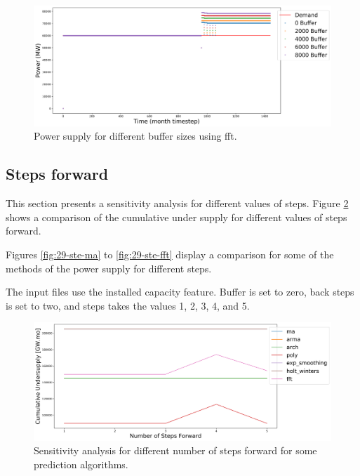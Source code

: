 \documentclass[11pt]{article}
\begin{document}
\begin{figure}[H]
	\centering
	\includegraphics[width=\textwidth]{29-figures/29-power-buffer-fft.png} 
	\hfill
	\caption{Power supply for different buffer sizes using fft.}
	\label{fig:29-buf-fft}
\end{figure}

\subsection{Steps forward}

This section presents a sensitivity analysis for different values of steps.
Figure \ref{fig:29-steps} shows a comparison of the cumulative under supply for different values of steps forward.

Figures \ref{fig:29-ste-ma} to \ref{fig:29-ste-fft} display a comparison for some of the methods of the power supply for different steps.

The input files use the installed capacity feature. Buffer is set to zero, back steps is set to two, and steps takes the values 1, 2, 3, 4, and 5.

\begin{figure}[H]
	\centering
	\includegraphics[width=\textwidth]{29-figures/29-sens-steps.png} 
	\hfill
	\caption{Sensitivity analysis for different number of steps forward for some prediction algorithms.}
	\label{fig:29-steps}
\end{figure}
\end{document}
